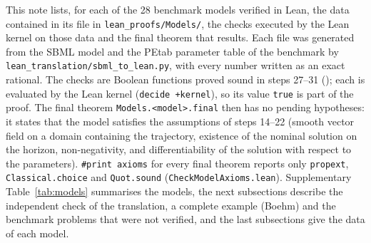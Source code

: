 \sloppy

This note lists, for each of the 28 benchmark models verified in Lean, the data contained in its file in \texttt{lean\_proofs/Models/}, the checks executed by the Lean kernel on those data and the final theorem that results. Each file was generated from the SBML model and the PEtab parameter table of the benchmark by \texttt{lean\_translation/sbml\_to\_lean.py}, with every number written as an exact rational. The checks are Boolean functions proved sound in steps 27--31 (); each is evaluated by the Lean kernel (\texttt{decide +kernel}), so its value \texttt{true} is part of the proof. The final theorem \texttt{Models.<model>.final} then has no pending hypotheses: it states that the model satisfies the assumptions of steps 14--22 (smooth vector field on a domain containing the trajectory, existence of the nominal solution on the horizon, non-negativity, and differentiability of the solution with respect to the parameters). \texttt{\#print axioms} for every final theorem reports only \texttt{propext}, \texttt{Classical.choice} and \texttt{Quot.sound} (\texttt{CheckModelAxioms.lean}). Supplementary Table~\ref{tab:models} summarises the models, the next subsections describe the independent check of the translation, a complete example (Boehm) and the benchmark problems that were not verified, and the last subsections give the data of each model.


